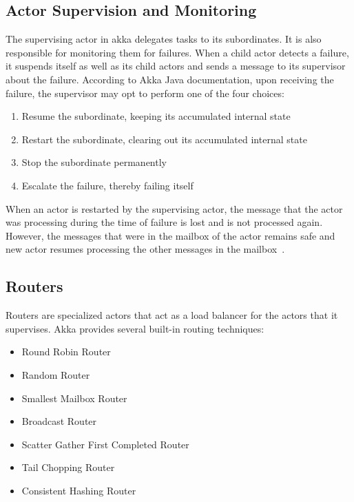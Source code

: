   \subsection{Actor Supervision and Monitoring}
  \label{subsec:supervisionMonitoring}
  The supervising actor in akka delegates tasks to its subordinates. It is also responsible for monitoring them for failures. When a child actor detects a failure, it suspends itself as well as its child actors and sends a message to its supervisor about the failure. According to Akka Java documentation\cite{akkaJavaDoc}, upon receiving the failure, the supervisor may opt to perform one of the four choices:
  \begin{enumerate}
    \item Resume the subordinate, keeping its accumulated internal state
    \item Restart the subordinate, clearing out its accumulated internal state
    \item Stop the subordinate permanently
    \item Escalate the failure, thereby failing itself
  \end{enumerate}

  When an actor is restarted by the supervising actor, the message that the actor was processing during the time of failure is lost and is not processed again. However, the messages that were in the mailbox of the actor remains safe and new actor resumes processing the other messages in the mailbox~\cite{akkaJavaDoc}.

  \subsection{Routers}
  \label{subsec:akka-routers}
  Routers are specialized actors that act as a load balancer for the actors that it supervises. Akka provides several built-in routing techniques:~\cite{akkaJavaDoc}
  \begin{itemize}
    \item Round Robin Router
    \item Random Router
    \item Smallest Mailbox Router
    \item Broadcast Router
    \item Scatter Gather First Completed Router
    \item Tail Chopping Router
    \item Consistent Hashing Router
  \end{itemize}

